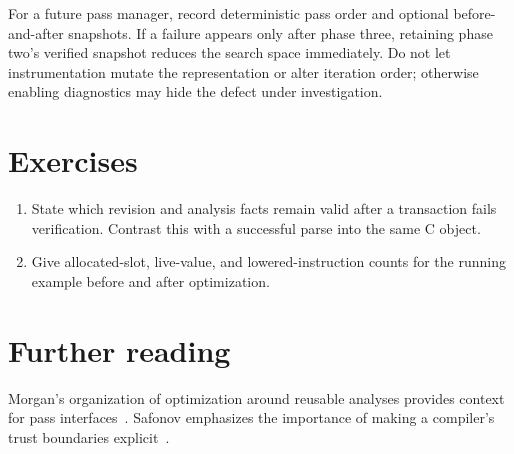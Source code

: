 For a future pass manager, record deterministic pass order and optional before-and-after snapshots.
If a failure appears only after phase three, retaining phase two's verified snapshot reduces the search space immediately.
Do not let instrumentation mutate the representation or alter iteration order; otherwise enabling diagnostics may hide the defect under investigation.

\section{Exercises}
\label{sec:pebble-thirteen-exercises}
\begin{enumerate}
\item \label{ex:pebble-failed-pass} State which revision and analysis facts remain valid after a transaction fails verification. Contrast this with a successful parse into the same C object.
\item \label{ex:pebble-three-counts} Give allocated-slot, live-value, and lowered-instruction counts for the running example before and after optimization.
\end{enumerate}

\section{Further reading}
\label{sec:pebble-thirteen-reading}
Morgan's organization of optimization around reusable analyses provides context for pass interfaces~\cite{morgan-1998-optimizing}.
Safonov emphasizes the importance of making a compiler's trust boundaries explicit~\cite{safonov-2010-trustworthy}.

